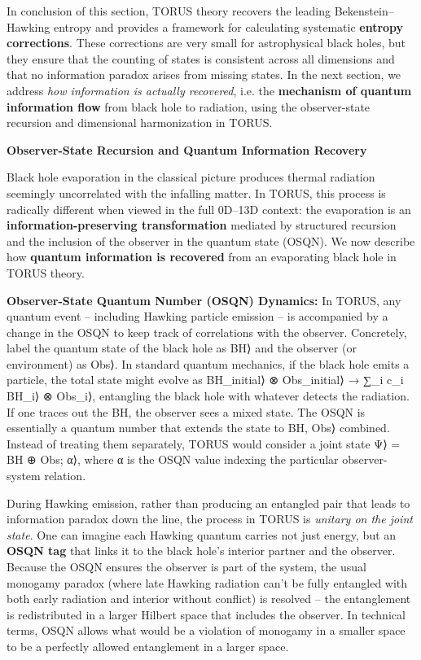 \documentclass[]{article}
\begin{document}
In conclusion of this section, TORUS theory recovers the leading
Bekenstein--Hawking entropy and provides a framework for calculating
systematic \textbf{entropy corrections}. These corrections are very
small for astrophysical black holes, but they ensure that the counting
of states is consistent across all dimensions and that no information
paradox arises from missing states. In the next section, we address
\emph{how information is actually recovered}, i.e. the \textbf{mechanism
of quantum information flow} from black hole to radiation, using the
observer-state recursion and dimensional harmonization in TORUS.

\textbf{Observer-State Recursion and Quantum Information Recovery}

Black hole evaporation in the classical picture produces thermal
radiation seemingly uncorrelated with the infalling matter. In TORUS,
this process is radically different when viewed in the full 0D--13D
context: the evaporation is an \textbf{information-preserving
transformation} mediated by structured recursion and the inclusion of
the observer in the quantum state (OSQN). We now describe how
\textbf{quantum information is recovered} from an evaporating black hole
in TORUS theory.

\textbf{Observer-State Quantum Number (OSQN) Dynamics:} In TORUS, any
quantum event -- including Hawking particle emission -- is accompanied
by a change in the OSQN to keep track of correlations with the observer.
Concretely, label the quantum state of the black hole as \textbar{}BH⟩
and the observer (or environment) as \textbar{}Obs⟩. In standard quantum
mechanics, if the black hole emits a particle, the total state might
evolve as \textbar{}BH\_initial⟩ ⊗ \textbar{}Obs\_initial⟩ → ∑\_i c\_i
\textbar{}BH\_i⟩ ⊗ \textbar{}Obs\_i⟩, entangling the black hole with
whatever detects the radiation. If one traces out the BH, the observer
sees a mixed state. The OSQN is essentially a quantum number that
extends the state to \textbar{}BH, Obs⟩ combined. Instead of treating
them separately, TORUS would consider a joint state \textbar{}Ψ⟩ =
\textbar{}BH ⊕ Obs; α⟩, where α is the OSQN value indexing the
particular observer-system relation.

During Hawking emission, rather than producing an entangled pair that
leads to information paradox down the line, the process in TORUS is
\emph{unitary on the joint state}. One can imagine each Hawking quantum
carries not just energy, but an \textbf{OSQN tag} that links it to the
black hole's interior partner and the observer. Because the OSQN ensures
the observer is part of the system, the usual monogamy paradox (where
late Hawking radiation can't be fully entangled with both early
radiation and interior without conflict) is resolved -- the entanglement
is redistributed in a larger Hilbert space that includes the observer.
In technical terms, OSQN allows what would be a violation of monogamy in
a smaller space to be a perfectly allowed entanglement in a larger
space.
\end{document}
